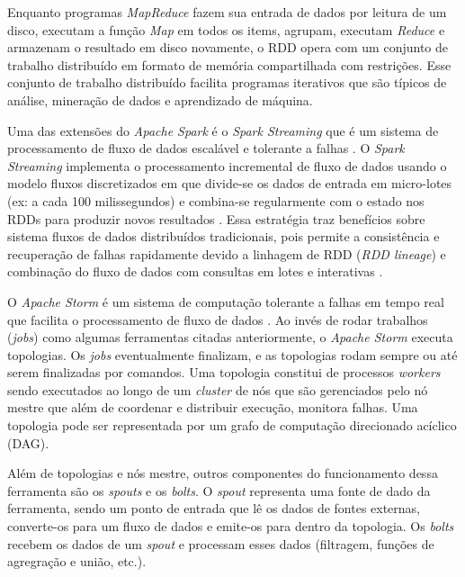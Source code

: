
Enquanto programas \emph{MapReduce} fazem sua entrada de dados por leitura de um
disco, executam a função \emph{Map} em todos os items, agrupam, executam
\emph{Reduce} e armazenam o resultado em disco novamente, o RDD opera com um
conjunto de trabalho distribuído em formato de memória compartilhada com
restrições. Esse conjunto de trabalho distribuído facilita programas iterativos
que são típicos de análise, mineração de dados e aprendizado de máquina.

Uma das extensões do \emph{Apache Spark} é o \emph{Spark Streaming} que é um sistema de processamento de fluxo de dados escalável e  tolerante a falhas \cite{zaharia2016,sparkStreaming2016}. O \emph{Spark Streaming} implementa o processamento incremental de fluxo de dados usando o modelo fluxos discretizados em que divide-se os dados de entrada em micro-lotes (ex: a cada 100 milissegundos) e combina-se regularmente com o estado nos RDDs para produzir novos resultados \cite{zaharia2016}. Essa estratégia traz benefícios sobre sistema fluxos de dados distribuídos tradicionais, pois permite a consistência e recuperação de falhas rapidamente devido a linhagem de RDD (\emph{RDD lineage}) e combinação do fluxo de dados com consultas em lotes e interativas \cite{sparkStreaming2016,Lopez2018}.

O \emph{Apache Storm} é um sistema de computação tolerante a falhas em tempo real que facilita o processamento de fluxo de dados \cite{ApacheStorm2020,Lopez2018}. Ao invés de rodar trabalhos (\emph{jobs}) como algumas ferramentas citadas anteriormente, o \emph{Apache Storm} executa topologias. Os \emph{jobs} eventualmente finalizam, e as topologias rodam sempre ou até serem finalizadas por comandos. Uma topologia constitui de processos \emph{workers} sendo executados ao longo de um \emph{cluster} de nós que são gerenciados pelo nó mestre que além de coordenar e distribuir execução, monitora falhas. Uma topologia pode ser representada por um grafo de computação direcionado acíclico (DAG). 

Além de topologias e nós mestre, outros componentes do funcionamento dessa ferramenta são os \emph{spouts} e os \emph{bolts}. O \emph{spout} representa uma fonte de dado da ferramenta, sendo um ponto de entrada que lê os dados de fontes externas, converte-os para um fluxo de dados e emite-os para dentro da topologia. Os \emph{bolts} recebem os dados de um \emph{spout} e processam esses dados (filtragem, funções de agregração e união, etc.).

